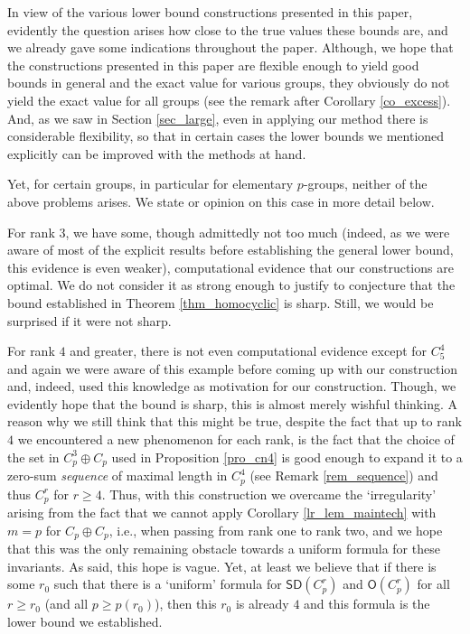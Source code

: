 \documentclass{amsart}
\theoremstyle{definition}
\numberwithin{equation}{section}
\begin{document}
In view of the various lower bound constructions presented in this paper,
evidently the question arises how close to the true values these bounds are,
and we already gave some indications throughout the paper.
Although, we hope that the constructions presented in this paper
are flexible enough to yield good bounds in general and the exact value
for  various groups,
they obviously do not yield the exact value for all groups (see the remark after Corollary \ref{co_excess}).
And, as we saw in Section \ref{sec_large}, even in applying our method there
is considerable flexibility, so that in certain cases the
lower bounds we mentioned explicitly can be improved with the methods at hand.

Yet, for certain groups, in particular for elementary $p$-groups, neither of the above problems
arises. We state or opinion on this case in more detail below.

For rank $3$, we have some, though admittedly not too much (indeed, as we were aware of most of the explicit results before establishing the general lower bound, this evidence is even weaker), computational evidence that our constructions are optimal. We do not consider it as strong enough to justify to conjecture that the bound established in Theorem  \ref{thm_homocyclic} is sharp.  Still, we would be surprised if it were not sharp.

For rank $4$ and greater, there is not even computational evidence except for
$C_5^4$ and again we were aware of this example before coming up with our construction and, indeed, used this knowledge as motivation for our construction.
Though, we evidently hope that the bound is sharp, this is almost merely wishful thinking. A reason why we still think that this might be true, despite the fact that up to rank $4$ we encountered a new phenomenon for each rank, is the fact that the choice of the set in $C_p^3 \oplus C_p$ used in Proposition \ref{pro_cn4} is good enough to expand it to a zero-sum \emph{sequence} of maximal length in $C_p^4$ (see Remark \ref{rem_sequence}) and thus $C_p^r$ for $r\ge 4$. Thus, with this construction we overcame the `irregularity' arising from the fact that we cannot apply Corollary \ref{lr_lem_maintech} with $m=p$ for $C_p \oplus C_p$, i.e., when passing from rank one to rank two, and we hope that this was the only remaining obstacle towards a uniform formula for these invariants. As said, this hope is vague. Yet, at least we believe that if there is some $r_0$ such that there is a `uniform' formula for ${\mathsf{SD}}(C_p^r)$ and ${\mathsf{O}}(C_p^r)$ for all  $r\ge r_0$  (and all $p\ge p(r_0)$), then this $r_0$ is already $4$ and this formula is the lower bound we established.
\end{document}
